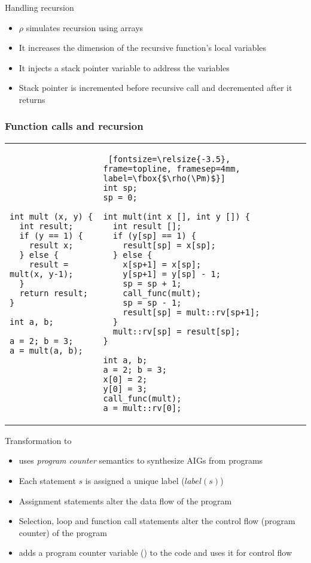 \begin{frame}{Handling recursion}
\begin{itemize}
 \item $\rho$ simulates recursion using arrays
 \item It increases the dimension of the recursive function's local variables
 \item It injects a stack pointer variable  to address the variables
 \item Stack pointer is incremented before recursive call and decremented 
 after it returns
\end{itemize}
\end{frame}

\begin{frame}[containsverbatim]
\frametitle{Function calls and recursion}
  \begin{tabular}{p{2.2in}|p{2.4in}}
\begin{Verbatim}[fontsize=\relsize{-3.5}, 
frame=topline, framesep=4mm, label=\fbox{\Pm}]
int mult (x, y) {
  int result;
  if (y == 1) {
    result x;
  } else {
    result = mult(x, y-1);
  }
  return result;
}

int a, b;

a = 2; b = 3;
a = mult(a, b);
\end{Verbatim}
& 
\begin{Verbatim} [fontsize=\relsize{-3.5},
frame=topline, framesep=4mm, label=\fbox{$\rho(\Pm)$}]
int sp;
sp = 0;

int mult(int x [], int y []) {
  int result [];
  if (y[sp] == 1) {
    result[sp] = x[sp]; 
  } else {
    x[sp+1] = x[sp];
    y[sp+1] = y[sp] - 1;
    sp = sp + 1;
    call_func(mult);
    sp = sp - 1;
    result[sp] = mult::rv[sp+1];
  }
  mult::rv[sp] = result[sp];
}

int a, b;
a = 2; b = 3;
x[0] = 2;
y[0] = 3;
call_func(mult);
a = mult::rv[0];
\end{Verbatim}
\end{tabular}
\end{frame}

\begin{frame}{Transformation to \thislanguage}
 \begin{itemize}
  \item \mytool{} uses {\em program counter} semantics to 
  synthesize AIGs from \psqlanguage{} programs
  \item Each statement $s$ is assigned a unique label ($label(s)$)
  \item Assignment statements alter the data flow of the program 
  \item Selection, loop and function call statements alter the control
  flow (program counter) of the program
  \item \mytool{} adds a program counter variable () to the code
  and uses it for control flow
 \end{itemize}
\end{frame}

